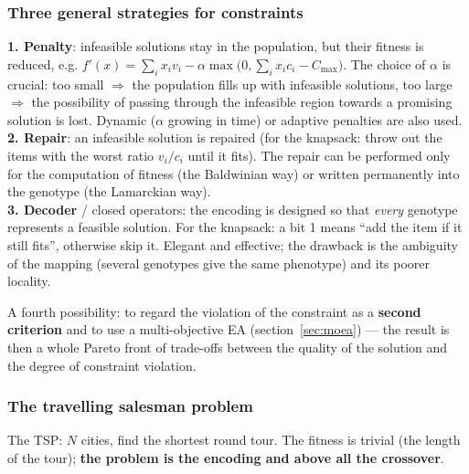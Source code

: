 \documentclass[11pt,a4paper]{article}
\theoremstyle{definition}
\providecommand{\uv}[1]{``#1''}
\begin{document}
\subsubsection{Three general strategies for constraints}

\begin{defbox}
\textbf{1. Penalty}: infeasible solutions stay in the population, but their
fitness is reduced, e.g.
$f'(x) = \sum_i x_i v_i - \alpha \max\big(0, \sum_i x_i c_i - C_{\max}\big)$.
The choice of $\alpha$ is crucial: too small $\Rightarrow$ the population fills
up with infeasible solutions, too large $\Rightarrow$ the possibility of passing
through the infeasible region towards a promising solution is lost. Dynamic
($\alpha$ growing in time) or adaptive penalties are also used.\\
\textbf{2. Repair}: an infeasible solution is repaired (for the knapsack: throw
out the items with the worst ratio $v_i/c_i$ until it fits). The repair can be
performed only for the computation of fitness (the Baldwinian way) or written
permanently into the genotype (the Lamarckian way).\\
\textbf{3. Decoder} / closed operators: the encoding is designed so that
\emph{every} genotype represents a feasible solution. For the knapsack: a bit
1 means \uv{add the item if it still fits}, otherwise skip it. Elegant and
effective; the drawback is the ambiguity of the mapping (several genotypes give
the same phenotype) and its poorer locality.
\end{defbox}

A fourth possibility: to regard the violation of the constraint as a
\textbf{second criterion} and to use a multi-objective EA
(section~\ref{sec:moea}) --- the result is then a whole Pareto front of
trade-offs between the quality of the solution and the degree of constraint
violation.

\subsubsection{The travelling salesman problem}

The TSP: $N$ cities, find the shortest round tour. The fitness is trivial (the
length of the tour); \textbf{the problem is the encoding and above all the
crossover}.
\end{document}
